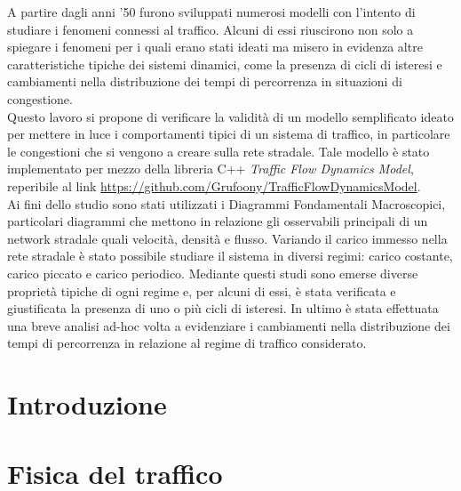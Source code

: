 \documentclass[12pt,a4paper]{report}
\begin{document}
A partire dagli anni '50 furono sviluppati numerosi modelli con l'intento di studiare i fenomeni connessi al traffico.
Alcuni di essi riuscirono non solo a spiegare i fenomeni per i quali erano stati ideati ma misero in evidenza altre caratteristiche tipiche dei sistemi dinamici, come la presenza di cicli di isteresi e cambiamenti nella distribuzione dei tempi di percorrenza in situazioni di congestione.\\
Questo lavoro si propone di verificare la validit\`a di un modello semplificato ideato per mettere in luce i comportamenti tipici di un sistema di traffico, in particolare le congestioni che si vengono a creare sulla rete stradale.
Tale modello \`e stato implementato per mezzo della libreria C++ \emph{Traffic Flow Dynamics Model}, reperibile al link \url{https://github.com/Grufoony/TrafficFlowDynamicsModel}.\\
Ai fini dello studio sono stati utilizzati i Diagrammi Fondamentali Macroscopici, particolari diagrammi che mettono in relazione gli osservabili principali di un network stradale quali velocit\`a, densit\`a e flusso.
Variando il carico immesso nella rete stradale \`e stato possibile studiare il sistema in diversi regimi: carico costante, carico piccato e carico periodico.
Mediante questi studi sono emerse diverse propriet\`a tipiche di ogni regime e, per alcuni di essi, \`e stata verificata e giustificata la presenza di uno o pi\`u cicli di isteresi.
In ultimo \`e stata effettuata una breve analisi ad-hoc volta a evidenziare i cambiamenti nella distribuzione dei tempi di percorrenza in relazione al regime di traffico considerato.

\newpage
\thispagestyle{empty}
\mbox{}

\tableofcontents

\newpage
\thispagestyle{empty}
\mbox{}

\listoffigures

\newpage
\thispagestyle{empty}
\mbox{}

\chapter*{Introduzione}


\chapter{Fisica del traffico}


\newpage
\thispagestyle{empty}
\mbox{}
\end{document}

